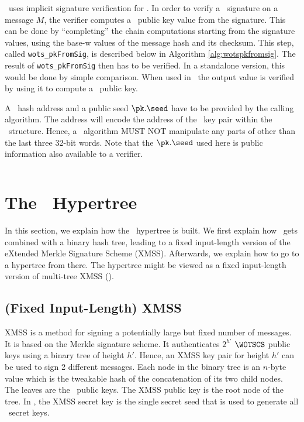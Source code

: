 \SPHINCSA\ uses implicit signature verification for \WOTSCS. In order to verify a \WOTSCS\ signature \sig on a message $M$, the verifier computes a \WOTSCS\ public key value from the signature. This can be done by ``completing'' the chain computations starting from the signature values, using the base-w values of the message hash and its checksum. This step, called \texttt{wots\_pkFromSig}, is described below in Algorithm \ref{alg:wotspkfromsig}. The result of \texttt{wots\_pkFromSig} then has to be verified. In a standalone version, this would be done by simple comparison. When used in \SPHINCSA\ the output value is verified by using it to compute a \SPHINCSA\ public key. 

A \WOTSCS\ hash address \ADRS and a public seed $\pk.\seed$ have to be provided by the calling algorithm. The address will encode the address of the \WOTSCS\ key pair within the \SPHINCSA\ structure. Hence, a \WOTSCS\ algorithm MUST NOT manipulate any parts of \ADRS other than the last three 32-bit words. Note that the $\pk.\seed$ used here is public information also available to a verifier.

\begin{algorithm}
\inputminted[breaklines,linenos,tabsize=2,mathescape,escapeinside=||]{C}{code/wots_pkFromSig.cs}
\caption{\texttt{wots\_pkFromSig} --- Computing a \WOTSCS\ public key from a message and its signature.}
\label{alg:wotspkfromsig}
\end{algorithm}


\section{The \SPHINCSA\ Hypertree}
\label{sec:hypertree}

In this section, we explain how the \SPHINCSA\ hypertree is built. We first explain how \WOTSCS\ gets combined with a binary hash tree, leading to a fixed input-length version of the eXtended Merkle Signature Scheme (XMSS). Afterwards, we explain how to go to a hypertree from there. The hypertree might be viewed as a fixed input-length version of multi-tree XMSS (\XMSSMT).


\subsection{(Fixed Input-Length) XMSS} \label{sec:xmss}

XMSS is a method for signing a potentially large but fixed number of messages. It is based on the Merkle signature scheme. It authenticates $2^{h'}$ $\WOTSCS$ public keys using a binary tree of height $h'$. Hence, an XMSS key pair for height $h'$ can be used to sign 2 different messages. Each node in the binary tree is an $n$-byte value which is the tweakable hash of the concatenation of its two child nodes. The leaves are the \WOTSCS\ public keys. The XMSS public key is the root node of the tree. In \SPHINCSA, the XMSS secret key is the single secret seed that is used to generate all \WOTSCS\ secret keys.

